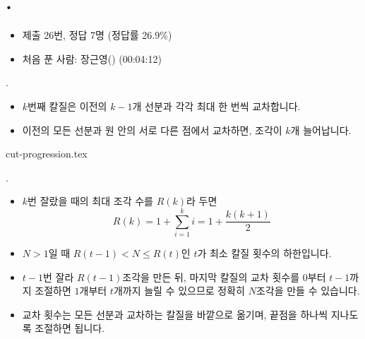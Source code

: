 
\section{\texorpdfstring{\pletter. \ptitle}{문제 \pletter}}

\begin{frame}[label=problem-B]
    \sectiontitle{\pletter}{\ptitle}

    \begin{itemize}
        \item 제출 26번, 정답 7명 (정답률 26.9\%)
        \item 처음 푼 사람: 장근영() (00:04:12)
    \end{itemize}
\end{frame}

\begin{frame}{\textbf{\pletter}. \ptitle}
    \begin{itemize}
        \item $k$번째 칼질은 이전의 $k-1$개 선분과 각각 최대 한 번씩 교차합니다.
        \item 이전의 모든 선분과 원 안의 서로 다른 점에서 교차하면, 조각이 $k$개 늘어납니다.
    \end{itemize}
    \begin{center}
        {cut-progression.tex}
    \end{center}
\end{frame}

\begin{frame}{\textbf{\pletter}. \ptitle}
    \begin{itemize}
        \item $k$번 잘랐을 때의 최대 조각 수를 $R(k)$라 두면
        \[
            R(k)=1+\sum_{i=1}^{k}i=1+\frac{k(k+1)}{2}
        \]
        \item $N>1$일 때 $R(t-1)<N\le R(t)$인 $t$가 최소 칼질 횟수의 하한입니다.
        \item $t-1$번 잘라 $R(t-1)$조각을 만든 뒤, 마지막 칼질의 교차 횟수를 $0$부터 $t-1$까지 조절하면
              $1$개부터 $t$개까지 늘릴 수 있으므로 정확히 $N$조각을 만들 수 있습니다.
        \item 교차 횟수는 모든 선분과 교차하는 칼질을 바깥으로 옮기며, 끝점을 하나씩 지나도록 조절하면 됩니다.
    \end{itemize}
\end{frame}

